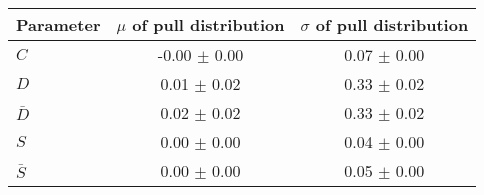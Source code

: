 \begin{tabular}{l  c  c}
\hline
Parameter & $\mu$ of pull distribution & $\sigma$ of pull distribution \\
\hline
\hline
$C$ & -0.00 $\pm$ 0.00 & 0.07 $\pm$ 0.00 \\
$D$ & 0.01 $\pm$ 0.02 & 0.33 $\pm$ 0.02 \\
$\bar{D}$ & 0.02 $\pm$ 0.02 & 0.33 $\pm$ 0.02 \\
$S$ & 0.00 $\pm$ 0.00 & 0.04 $\pm$ 0.00 \\
$\bar{S}$ & 0.00 $\pm$ 0.00 & 0.05 $\pm$ 0.00 \\
\hline
\end{tabular}
